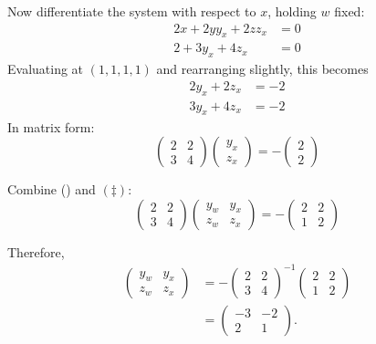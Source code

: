 \documentclass[answers]{exam}
\begin{document}
\begin{questions}
\begin{solution}
        Now differentiate the system with respect to $x$, holding $w$ fixed:
        \begin{align*}
            2x + 2yy_x + 2zz_x &= 0\\
            2 + 3y_x + 4z_x &= 0
        \end{align*}
        Evaluating at $(1,1,1,1)$ and rearranging slightly, this becomes
        \begin{align*}
            2y_x + 2z_x &= -2\\
            3y_x + 4z_x &= -2
        \end{align*}
        In matrix form:
        \[
            \begin{pmatrix}
                2&2\\3&4
            \end{pmatrix}\begin{pmatrix}
                y_x\\z_x
            \end{pmatrix}= -\begin{pmatrix}
                2\\2
            \end{pmatrix}\tag{\ddag}
        \]

        Combine (\dag) and $(\ddag)$:
        \[
            \begin{pmatrix}
                2&2\\3&4
            \end{pmatrix}\begin{pmatrix}
                y_w&y_x\\z_w&z_x
            \end{pmatrix}= -\begin{pmatrix}
                2&2\\1&2
            \end{pmatrix}
        \]

        Therefore,
        \begin{align*}
            \begin{pmatrix}
                y_w&y_x\\z_w&z_x
            \end{pmatrix}&=- \begin{pmatrix}
                2&2\\3&4
            \end{pmatrix}^{-1}\begin{pmatrix}
                2&2\\1&2
            \end{pmatrix}\\
            &= \begin{pmatrix}
                -3&-2\\2&1
            \end{pmatrix}.
        \end{align*}
    \end{solution}


\end{questions}
\end{document}
